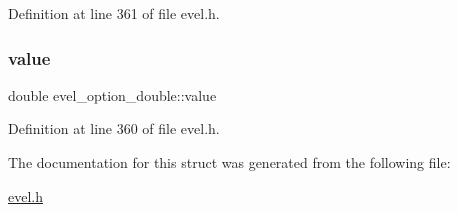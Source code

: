 Definition at line 361 of file evel.\+h.

\hypertarget{structevel__option__double_a738945aa8b2dba3328031d4fe6d9e298}{}\label{structevel__option__double_a738945aa8b2dba3328031d4fe6d9e298} 
\subsubsection{\texorpdfstring{value}{value}}
{\footnotesize\ttfamily double evel\+\_\+option\+\_\+double\+::value}



Definition at line 360 of file evel.\+h.



The documentation for this struct was generated from the following file\+:\begin{DoxyCompactItemize}
\item 
\hyperlink{evel_8h}{evel.\+h}\end{DoxyCompactItemize}
